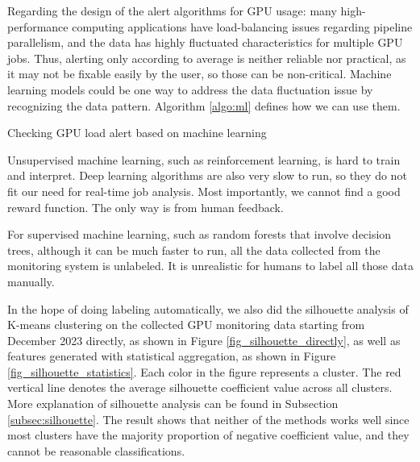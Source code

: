 Regarding the design of the alert algorithms for GPU usage: many high-performance computing applications have load-balancing issues regarding pipeline parallelism, and the data has highly fluctuated characteristics for multiple GPU jobs. Thus, alerting only according to average is neither reliable nor practical, as it may not be fixable easily by the user, so those can be non-critical. Machine learning models could be one way to address the data fluctuation issue by recognizing the data pattern. Algorithm \ref{algo:ml} defines how we can use them.

\begin{algorithm}[H]
\SetAlgoLined
{}



\caption{Checking GPU load alert based on machine learning}
\label{algo:ml}
\end{algorithm}

Unsupervised machine learning, such as reinforcement learning, is hard to train and interpret. Deep learning algorithms are also very slow to run, so they do not fit our need for real-time job analysis. Most importantly, we cannot find a good reward function. The only way is from human feedback.

For supervised machine learning, such as random forests that involve decision trees, although it can be much faster to run, all the data collected from the monitoring system is unlabeled. It is unrealistic for humans to label all those data manually.

In the hope of doing labeling automatically, we also did the silhouette analysis of K-means clustering on the collected GPU monitoring data starting from December 2023 directly, as shown in Figure \ref{fig_silhouette_directly}, as well as features generated with statistical aggregation, as shown in Figure \ref{fig_silhouette_statistics}. Each color in the figure represents a cluster. The red vertical line denotes the average silhouette coefficient value across all clusters. More explanation of silhouette analysis can be found in Subsection \ref{subsec:silhouette}. The result shows that neither of the methods works well since most clusters have the majority proportion of negative coefficient value, and they cannot be reasonable classifications. 

